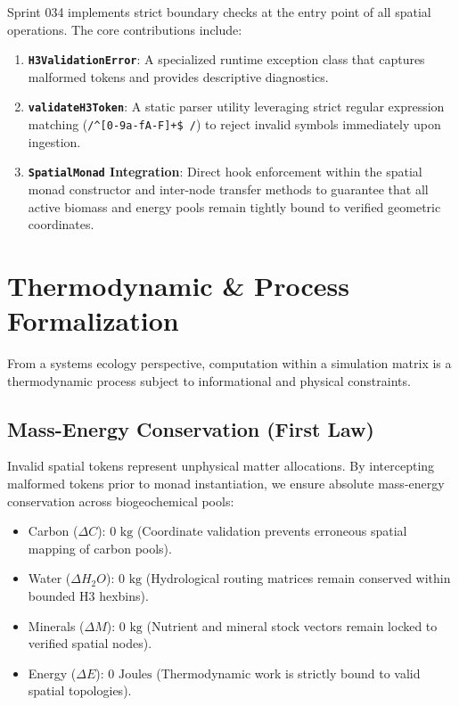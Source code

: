 \documentclass[11pt, a4paper]{article}
\begin{document}
Sprint 034 implements strict boundary checks at the entry point of all spatial operations. The core contributions include:
\begin{enumerate}
    \item \textbf{\texttt{H3ValidationError}}: A specialized runtime exception class that captures malformed tokens and provides descriptive diagnostics.
    \item \textbf{\texttt{validateH3Token}}: A static parser utility leveraging strict regular expression matching (\texttt{/^[0-9a-fA-F]+\$ /}) to reject invalid symbols immediately upon ingestion.
    \item \textbf{\texttt{SpatialMonad} Integration}: Direct hook enforcement within the spatial monad constructor and inter-node transfer methods to guarantee that all active biomass and energy pools remain tightly bound to verified geometric coordinates.
\end{enumerate}

\section{Thermodynamic \& Process Formalization}
From a systems ecology perspective, computation within a simulation matrix is a thermodynamic process subject to informational and physical constraints.

\subsection{Mass-Energy Conservation (First Law)}
Invalid spatial tokens represent unphysical matter allocations. By intercepting malformed tokens prior to monad instantiation, we ensure absolute mass-energy conservation across biogeochemical pools:
\begin{itemize}
    \item Carbon ($\Delta C$): $0 \text{ kg}$ (Coordinate validation prevents erroneous spatial mapping of carbon pools).
    \item Water ($\Delta H_2O$): $0 \text{ kg}$ (Hydrological routing matrices remain conserved within bounded H3 hexbins).
    \item Minerals ($\Delta M$): $0 \text{ kg}$ (Nutrient and mineral stock vectors remain locked to verified spatial nodes).
    \item Energy ($\Delta E$): $0 \text{ Joules}$ (Thermodynamic work is strictly bound to valid spatial topologies).
\end{itemize}
\end{document}
